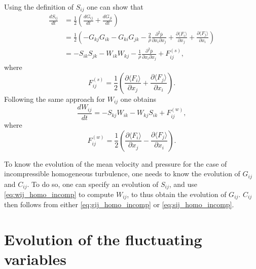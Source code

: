 \documentclass[oneside,a4paper,11pt]{report}
\newcommand{\pavg}{\overline{p}}
\begin{document}
Using the definition of $S_{ij}$ one can show that
\begin{align}
\label{eq:sij_homo_incomp}
\frac{d S_{ij}}{dt} &= \frac{1}{2} \left ( \frac{d G_{ij}}{dt} + \frac{d G_{ji}}{dt} \right ) \nonumber \\
& = \frac{1}{2} \left ( -G_{kj}G_{ik} - G_{ki}G_{jk} - \frac{2}{\rho} \frac{\partial^2 \pavg}{\partial x_i \partial x_j}  + \frac{\partial \langle F_i \rangle}{\partial x_j} + \frac{ \partial \langle F_j \rangle}{\partial x_i} \right ) \nonumber \\
& = -S_{ik}S_{jk} - W_{ik}W_{kj} - \frac{1}{\rho} \frac{\partial^2 \pavg}{\partial x_i \partial x_j} + F^{(s)}_{ij},
\end{align}
where
\begin{equation}
F^{(s)}_{ij} = \frac{1}{2} \left ( \frac{\partial \langle F_i \rangle}{\partial x_j} + \frac{ \partial \langle F_j \rangle}{\partial x_i} \right ).
\end{equation}
Following the same approach for $W_{ij}$ one obtains
\begin{equation}
\label{eq:wij_homo_incomp}
\frac{dW_{ij}}{dt} = -S_{kj}W_{ik} - W_{kj}S_{ik} + F^{(w)}_{ij},
\end{equation}
where
\begin{equation}
F^{(w)}_{ij} = \frac{1}{2} \left ( \frac{\partial \langle F_i \rangle}{\partial x_j} - \frac{ \partial \langle F_j \rangle}{\partial x_i} \right ).
\end{equation}

To know the evolution of the mean velocity and pressure for the case of incompressible homogeneous turbulence, one needs to know the evolution of $G_{ij}$ and $C_{ij}$. To do so, one can specify an evolution of $S_{ij}$, and use \cref{eq:wij_homo_incomp} to compute $W_{ij}$, to thus obtain the evolution of $G_{ij}$. $C_{ij}$ then follows from either \cref{eq:gij_homo_incomp} or \cref{eq:sij_homo_incomp}.


\section{Evolution of the fluctuating variables}

\end{document}
